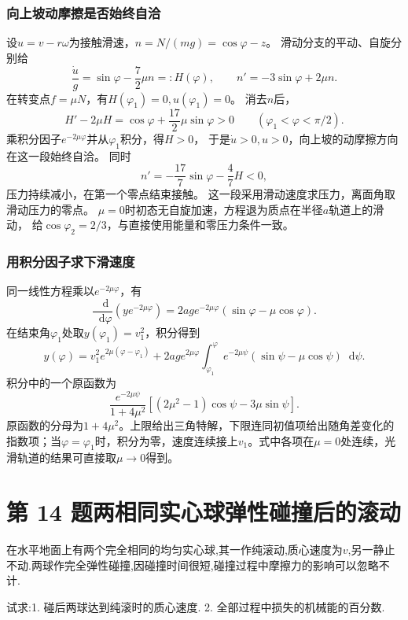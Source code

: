 \documentclass[UTF8,fontset=fandol,a4paper,11pt]{ctexart}
\newcommand{\dd}{\mathop{}\!\mathrm{d}}
\newcommand{\tagline}[1]{\noindent{\small\color{muted}#1}\par}
\begin{document}
\subsubsection*{向上坡动摩擦是否始终自洽}
设$u=v-r\omega$为接触滑速，$n=N/(mg)=\cos\varphi-z$。
滑动分支的平动、自旋分别给
\[
\frac{\dot u}{g}=\sin\varphi-\frac72\mu n=:H(\varphi),
\qquad n'=-3\sin\varphi+2\mu n.
\]
在转变点$f=\mu N$，有$H(\varphi_1)=0,u(\varphi_1)=0$。
消去$n$后，
\[
H'-2\mu H=\cos\varphi+\frac{17}{2}\mu\sin\varphi>0
\qquad(\varphi_1<\varphi<\pi/2).
\]
乘积分因子$e^{-2\mu\varphi}$并从$\varphi_1$积分，得$H>0$，
于是$\dot u>0,u>0$，向上坡的动摩擦方向在这一段始终自洽。
同时
\[
n'=-\frac{17}{7}\sin\varphi-\frac47H<0,
\]
压力持续减小，在第一个零点结束接触。
这一段采用滑动速度求压力，离面角取滑动压力的零点。
$\mu=0$时初态无自旋加速，方程退为质点在半径$a$轨道上的滑动，
给$\cos\varphi_2=2/3$，与直接使用能量和零压力条件一致。
\subsubsection*{用积分因子求下滑速度}
同一线性方程乘以$e^{-2\mu\varphi}$，有
\[
\frac{\dd}{\dd\varphi}\left(ye^{-2\mu\varphi}\right)
=2ag e^{-2\mu\varphi}(\sin\varphi-\mu\cos\varphi).
\]
在结束角$\varphi_1$处取$y(\varphi_1)=v_1^2$，积分得到
\[
y(\varphi)=v_1^2 e^{2\mu(\varphi-\varphi_1)}
+2ag e^{2\mu\varphi}\int_{\varphi_1}^{\varphi}
e^{-2\mu\psi}(\sin\psi-\mu\cos\psi)\dd\psi.
\]
积分中的一个原函数为
\[
\frac{e^{-2\mu\psi}}{1+4\mu^2}
[(2\mu^2-1)\cos\psi-3\mu\sin\psi].
\]
原函数的分母为$1+4\mu^2$。上限给出三角特解，下限连同初值项给出随角差变化的指数项；当$\varphi=\varphi_1$时，积分为零，速度连续接上$v_1$。式中各项在$\mu=0$处连续，光滑轨道的结果可直接取$\mu\to0$得到。





\section*{第 14 题\quad 两相同实心球弹性碰撞后的滚动}

\tagline{M-06-14}

在水平地面上有两个完全相同的均匀实心球,其一作纯滚动,质心速度为\(v\),另一静止不动.两球作完全弹性碰撞,因碰撞时间很短,碰撞过程中摩擦力的影响可以忽略不计.

试求:1. 碰后两球达到纯滚时的质心速度. 2. 全部过程中损失的机械能的百分数.
\end{document}
